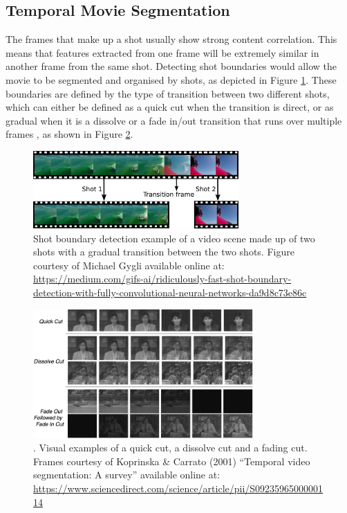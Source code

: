 
\subsection{Temporal Movie Segmentation}

The frames that make up a shot usually show strong content correlation. This means that features extracted from one frame will be extremely similar in another frame from the same shot. Detecting shot boundaries would allow the movie to be segmented and organised by shots, as depicted in Figure \ref{fig:shot_boundary_detection}. These boundaries are defined by the type of transition between two different shots, which can either be defined as a quick cut when the transition is direct, or as gradual when it is a dissolve or a fade in/out transition that runs over multiple frames \cite{yuan2007shotboundary}, as shown in Figure \ref{fig:video_transitions}.

\begin{figure}[h] 
\centerline{\includegraphics[width=0.70\textwidth]{figures/litsurvey/shot_boundary_detection.png}}
\caption{\label{fig:shot_boundary_detection}Shot boundary detection example of a video scene made up of two shots with a gradual transition between the two shots. Figure courtesy of Michael Gygli available online at: \url{https://medium.com/gifs-ai/ridiculously-fast-shot-boundary-detection-with-fully-convolutional-neural-networks-da9d8c73e86c}}
\end{figure}

\begin{figure}[h] 
\centerline{\includegraphics[width=0.75\textwidth]{figures/litsurvey/video_transitions.png}}
\caption{\label{fig:video_transitions}. Visual examples of a quick cut, a dissolve cut and a fading cut. Frames courtesy of Koprinska \& Carrato (2001) ``Temporal video segmentation: A survey'' available online at: \url{https://www.sciencedirect.com/science/article/pii/S0923596500000114}}
\end{figure}

